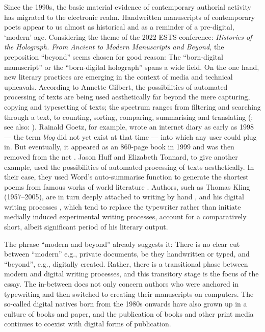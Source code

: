 \begin{paper}
Since the 1990s, the basic material evidence of contemporary authorial
activity has migrated to the electronic realm. Handwritten manuscripts
of contemporary poets appear to us almost as historical and as a
reminder of a pre-digital, `modern' age. Considering the theme of the
2022 ESTS conference: \emph{Histories of the Holograph. From Ancient to
Modern Manuscripts and Beyond,} the preposition ``beyond'' seems chosen
for good reason: The ``born-digital manuscript'' or the ``born-digital
holograph'' spans a wide field. On the one hand, new literary practices
are emerging in the context of media and technical upheavals. According
to Annette Gilbert, the possibilities of automated processing of texts
are being used aesthetically far beyond the mere capturing, copying and
typesetting of texts; the spectrum ranges from filtering and searching
through a text, to counting, sorting, comparing, summarising and
translating (\cite[511]{gilbert_zukunfte_2019}; see also: \cite[34--50]{gilbert_literatures_2022}). Rainald Goetz, for example, wrote an
internet diary as early as 1998 –– the term \emph{blog} did not yet
exist at that time –– into which any user could plug in. But
eventually, it appeared as an 860-page book in 1999 and was then removed
from the net \citep{goetz_abfall_1999}. Jason Huff and Elizabeth Tonnard, to give
another example, used the possibilities of automated processing of texts
aesthetically. In their case, they used Word's auto-summarise function to generate the
shortest poems from famous works of world literature \citep[511]{huff_autosummarize_2010, tonnard_speak_2010, gilbert_zukunfte_2019}. Authors, such as Thomas Kling
(1957--2005), are in turn deeply attached to writing by hand \citep{stussel_thomas_2013,wix_stratigraphic_2016}, and his digital writing processes \citep{ries_rationale_2018},
which tend to replace the typewriter rather than initiate medially
induced experimental writing processes, account for a comparatively
short, albeit significant period of his literary output.

The phrase ``modern and beyond'' already suggests it: There is no clear
cut between ``modern'' e.g., private documents, be they handwritten or
typed, and ``beyond'', e.g., digitally created. Rather, there is a
transitional phase between modern and digital writing processes, and
this transitory stage is the focus of the essay. The in-between does not
only concern authors who were anchored in typewriting and then switched
to creating their manuscripts on computers. The so-called digital
natives born from the 1980s onwards have also grown up in a culture of
books and paper, and the publication of books and other print media continues
to coexist with digital forms of publication.


\end{paper}
